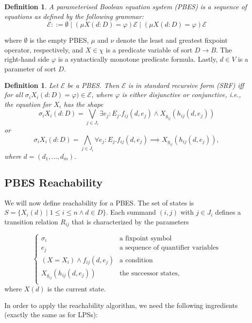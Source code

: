 \documentclass{article}
\newtheorem{definition}[theorem]{Definition}
\begin{document}
\begin{definition}
A parameterised Boolean equation system (PBES) is a sequence of equations as defined by the following grammar:
\[
\mathcal{E} ::= \emptyset \mid (\mu X(d:D) = \varphi) \mathcal{E} \mid (\mu X(d:D) = \varphi) \mathcal{E}
\]
\end{definition}
where $\emptyset$ is the empty PBES, $\mu$ and $\nu$ denote the least and greatest fixpoint operator, respectively, and $X \in \chi$ is a predicate
variable of sort $D \rightarrow B$. The right-hand side $\varphi$ is a syntactically monotone predicate formula. Lastly, $d \in V$ is a parameter of
sort $D$.

\begin{definition}
Let $\mathcal{E}$ be a PBES. Then $\mathcal{E}$ is in standard recursive form (SRF) iff for all $\sigma_i X_i(d:D) = \varphi) \in \mathcal{E}$, where
$\varphi$ is either disjunctive or conjunctive, i.e., the equation for $X_i$ has the shape
\[
  \sigma_i X_i(d:D) = \bigvee\limits_{j \in J_i} \exists e_j: E_j . f_{ij}(d,e_j) \land X_{g_{ij}}(h_{ij}(d, e_j))
\]
or
\[
  \sigma_i X_i(d:D) = \bigwedge\limits_{j \in J_i} \forall e_j: E_j . f_{ij}(d,e_j) \implies X_{g_{ij}}(h_{ij}(d, e_j)),
\]
where $d = (d_1, \ldots, d_m)$.
\end{definition}

\subsection{PBES Reachability}
We will now define reachability for a PBES.
The set of states is $S = \{ X_i(d) \mid 1 \leq i \leq n \land d \in D \}$.
Each summand $(i,j)$ with $j \in J_i$ defines a transition relation $R_{ij}$ that is characterized by the parameters

\[
\left\{
\begin{array}{ll}
    \sigma_i & \text{a fixpoint symbol} \\
    e_j & \text{a sequence of quantifier variables} \\
    (X = X_i) \land f_{ij}(d,e_j) & \text{a condition} \\
    X_{g_{ij}}(h_{ij}(d, e_j)) & \text{the successor states,} \\
\end{array}
\right.
\]
where $X(d)$ is the current state.

In order to apply the reachability algorithm, we need the following ingredients (exactly the same as for LPSs):
\end{document}
